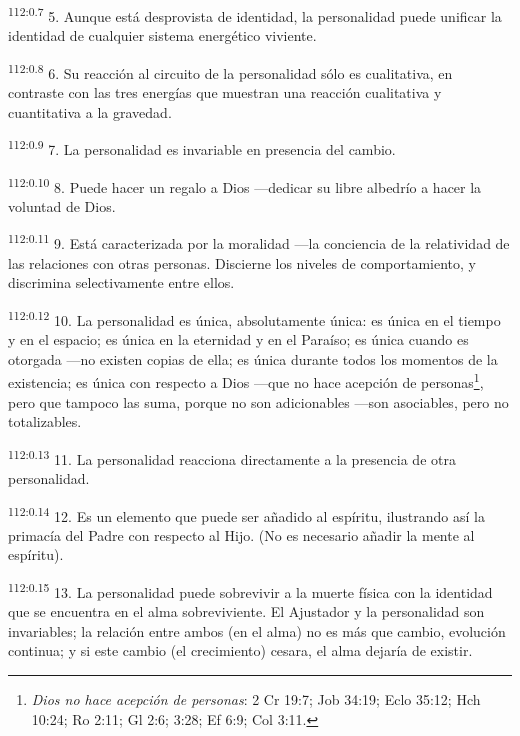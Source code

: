\par
\textsuperscript{112:0.7} 5. Aunque está desprovista de identidad, la personalidad puede unificar la identidad de cualquier sistema energético viviente.

\par
\textsuperscript{112:0.8} 6. Su reacción al circuito de la personalidad sólo es cualitativa, en contraste con las tres energías que muestran una reacción cualitativa y cuantitativa a la gravedad.

\par
\textsuperscript{112:0.9} 7. La personalidad es invariable en presencia del cambio.

\par
\textsuperscript{112:0.10} 8. Puede hacer un regalo a Dios ---dedicar su libre albedrío a hacer la voluntad de Dios.

\par
\textsuperscript{112:0.11} 9. Está caracterizada por la moralidad ---la conciencia de la relatividad de las relaciones con otras personas. Discierne los niveles de comportamiento, y discrimina selectivamente entre ellos.

\par
\textsuperscript{112:0.12} 10. La personalidad es única, absolutamente única: es única en el tiempo y en el espacio; es única en la eternidad y en el Paraíso; es única cuando es otorgada ---no existen copias de ella; es única durante todos los momentos de la existencia; es única con respecto a Dios ---que no hace acepción de personas\footnote{\textit{Dios no hace acepción de personas}: 2 Cr 19:7; Job 34:19; Eclo 35:12; Hch 10:24; Ro 2:11; Gl 2:6; 3:28; Ef 6:9; Col 3:11.}, pero que tampoco las suma, porque no son adicionables ---son asociables, pero no totalizables.

\par
\textsuperscript{112:0.13} 11. La personalidad reacciona directamente a la presencia de otra personalidad.

\par
\textsuperscript{112:0.14} 12. Es un elemento que puede ser añadido al espíritu, ilustrando así la primacía del Padre con respecto al Hijo. (No es necesario añadir la mente al espíritu).

\par
\textsuperscript{112:0.15} 13. La personalidad puede sobrevivir a la muerte física con la identidad que se encuentra en el alma sobreviviente. El Ajustador y la personalidad son invariables; la relación entre ambos (en el alma) no es más que cambio, evolución continua; y si este cambio (el crecimiento) cesara, el alma dejaría de existir.

